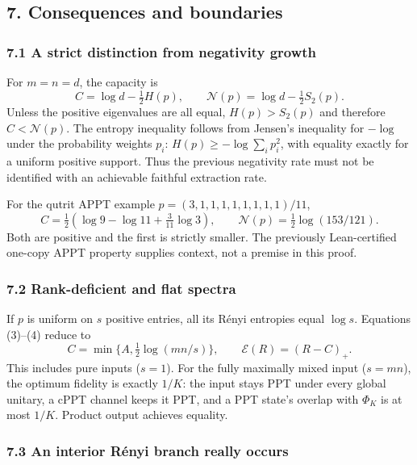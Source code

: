 \documentclass[11pt]{article}
\begin{document}
\hypertarget{consequences-and-boundaries}{%
\subsection{7. Consequences and boundaries}\label{consequences-and-boundaries}}

\hypertarget{a-strict-distinction-from-negativity-growth}{%
\subsubsection{7.1 A strict distinction from negativity growth}\label{a-strict-distinction-from-negativity-growth}}

For \(m=n=d\), the capacity is \[
 C=\log d-\tfrac12H(p),
 \qquad \mathcal N(p)=\log d-\tfrac12S_2(p).
 \tag{36}
\] Unless the positive eigenvalues are all equal, \(H(p)>S_2(p)\) and therefore \(C<\mathcal N(p)\). The entropy inequality follows from Jensen's inequality for \(-\log\) under the probability weights \(p_i\): \(H(p)\ge-\log\sum_i p_i^2\), with equality exactly for a uniform positive support. Thus the previous negativity rate must not be identified with an achievable faithful extraction rate.

For the qutrit APPT example \(p=(3,1,1,1,1,1,1,1,1)/11\), \[
 C=\tfrac12\left(\log9-\log11+\tfrac3{11}\log3\right),\qquad
 \mathcal N(p)=\tfrac12\log(153/121).
 \tag{37}
\] Both are positive and the first is strictly smaller. The previously Lean-certified one-copy APPT property supplies context, not a premise in this proof.

\hypertarget{rank-deficient-and-flat-spectra}{%
\subsubsection{7.2 Rank-deficient and flat spectra}\label{rank-deficient-and-flat-spectra}}

If \(p\) is uniform on \(s\) positive entries, all its Rényi entropies equal \(\log s\). Equations (3)--(4) reduce to \[
 C=\min\{A,\tfrac12\log(mn/s)\},\qquad \mathcal E(R)=(R-C)_+.
 \tag{38}
\] This includes pure inputs (\(s=1\)). For the fully maximally mixed input (\(s=mn\)), the optimum fidelity is exactly \(1/K\): the input stays PPT under every global unitary, a cPPT channel keeps it PPT, and a PPT state's overlap with \(\Phi_K\) is at most \(1/K\). Product output achieves equality.

\hypertarget{an-interior-ruxe9nyi-branch-really-occurs}{%
\subsubsection{7.3 An interior Rényi branch really occurs}\label{an-interior-ruxe9nyi-branch-really-occurs}}
\end{document}
